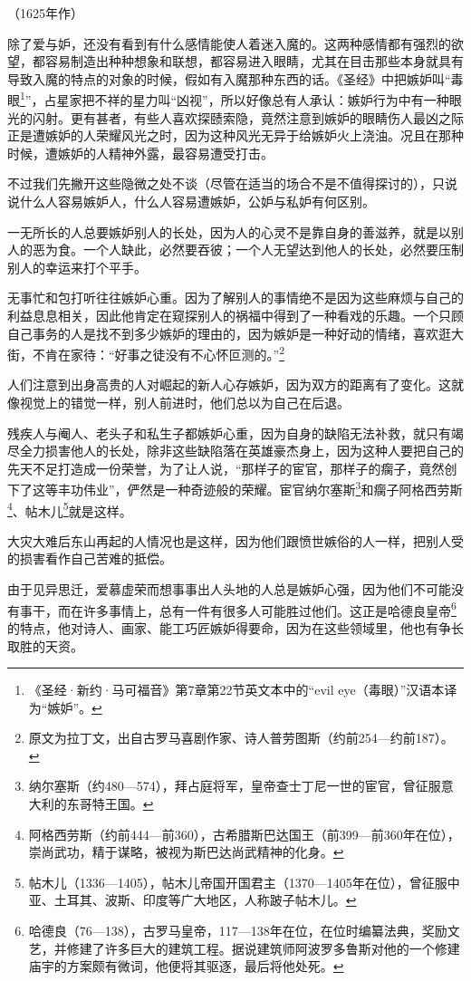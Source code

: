 \begin{center}
    （1625年作）
\end{center}
\par 除了爱与妒，还没有看到有什么感情能使人着迷入魔的。这两种感情都有强烈的欲望，都容易制造出种种想象和联想，都容易进入眼睛，尤其在目击那些本身就具有导致入魔的特点的对象的时候，假如有入魔那种东西的话。《圣经》中把嫉妒叫“毒眼\footnote{《圣经·新约·马可福音》第7章第22节英文本中的“evil eye（毒眼）”汉语本译为“嫉妒”。}”，占星家把不祥的星力叫“凶视”，所以好像总有人承认：嫉妒行为中有一种眼光的闪射。更有甚者，有些人喜欢探赜索隐，竟然注意到嫉妒的眼睛伤人最凶之际正是遭嫉妒的人荣耀风光之时，因为这种风光无异于给嫉妒火上浇油。况且在那种时候，遭嫉妒的人精神外露，最容易遭受打击。
\par 不过我们先撇开这些隐微之处不谈（尽管在适当的场合不是不值得探讨的），只说说什么人容易嫉妒人，什么人容易遭嫉妒，公妒与私妒有何区别。
\par 一无所长的人总要嫉妒别人的长处，因为人的心灵不是靠自身的善滋养，就是以别人的恶为食。一个人缺此，必然要吞彼；一个人无望达到他人的长处，必然要压制别人的幸运来打个平手。
\par 无事忙和包打听往往嫉妒心重。因为了解别人的事情绝不是因为这些麻烦与自己的利益息息相关，因此他肯定在窥探别人的祸福中得到了一种看戏的乐趣。一个只顾自己事务的人是找不到多少嫉妒的理由的，因为嫉妒是一种好动的情绪，喜欢逛大街，不肯在家待：“好事之徒没有不心怀叵测的。”\footnote{原文为拉丁文，出自古罗马喜剧作家、诗人普劳图斯（约前254—约前187）。}
\par 人们注意到出身高贵的人对崛起的新人心存嫉妒，因为双方的距离有了变化。这就像视觉上的错觉一样，别人前进时，他们总以为自己在后退。
\par 残疾人与阉人、老头子和私生子都嫉妒心重，因为自身的缺陷无法补救，就只有竭尽全力损害他人的长处，除非这些缺陷落在英雄豪杰身上，因为这种人要把自己的先天不足打造成一份荣誉，为了让人说，“那样子的宦官，那样子的瘸子，竟然创下了这等丰功伟业”，俨然是一种奇迹般的荣耀。宦官纳尔塞斯\footnote{纳尔塞斯（约480—574），拜占庭将军，皇帝查士丁尼一世的宦官，曾征服意大利的东哥特王国。}和瘸子阿格西劳斯\footnote{阿格西劳斯（约前444—前360），古希腊斯巴达国王（前399—前360年在位），崇尚武功，精于谋略，被视为斯巴达尚武精神的化身。}、帖木儿\footnote{帖木儿（1336—1405），帖木儿帝国开国君主（1370—1405年在位），曾征服中亚、土耳其、波斯、印度等广大地区，人称跛子帖木儿。}就是这样。
\par 大灾大难后东山再起的人情况也是这样，因为他们跟愤世嫉俗的人一样，把别人受的损害看作自己苦难的抵偿。
\par 由于见异思迁，爱慕虚荣而想事事出人头地的人总是嫉妒心强，因为他们不可能没有事干，而在许多事情上，总有一件有很多人可能胜过他们。这正是哈德良皇帝\footnote{哈德良（76—138），古罗马皇帝，117—138年在位，在位时编纂法典，奖励文艺，并修建了许多巨大的建筑工程。据说建筑师阿波罗多鲁斯对他的一个修建庙宇的方案颇有微词，他便将其驱逐，最后将他处死。}的特点，他对诗人、画家、能工巧匠嫉妒得要命，因为在这些领域里，他也有争长取胜的天资。
